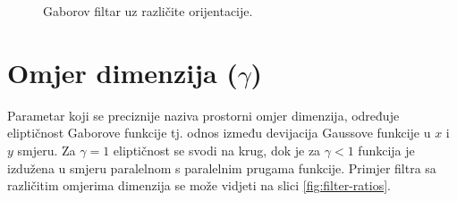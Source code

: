 \documentclass[12pt,a4paper]{ReportAA}
\begin{document}
\begin{figure}[h!tb]
\centering
{}
\hspace{50pt}
\caption{Gaborov filtar uz različite orijentacije.}
\label{fig:filter-orientations}
\end{figure}


\section{Omjer dimenzija ($\gamma $)}
Parametar koji se preciznije naziva prostorni omjer dimenzija, određuje
eliptičnost Gaborove funkcije tj. odnos između devijacija Gaussove funkcije u
$x$ i $y$ smjeru. Za $\gamma = 1$ eliptičnost se svodi na krug, dok je za
$\gamma < 1$ funkcija je izdužena u smjeru paralelnom s paralelnim prugama
funkcije. Primjer filtra sa različitim omjerima dimenzija se može vidjeti na
slici \ref{fig:filter-ratios}.
\end{document}

